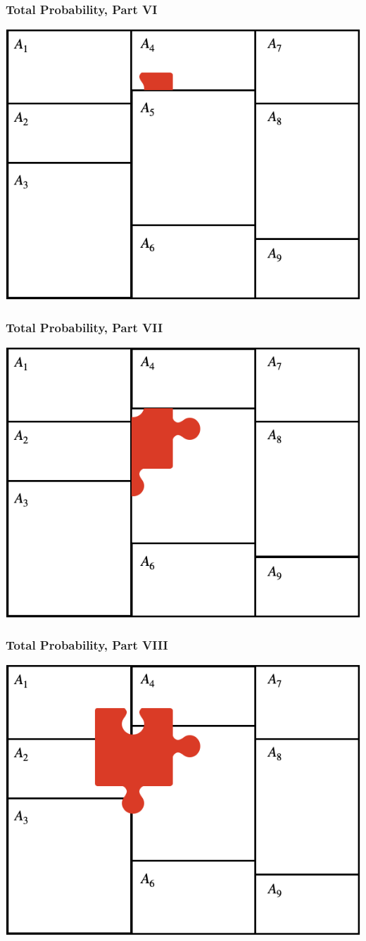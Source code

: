 \documentclass[12pt, block=fill]{beamer}
\begin{document}
\begin{frame}
  \frametitle{Total Probability, Part VI}
  \begin{center}
    \includegraphics[width=0.75\linewidth]{./figures/total_probability_4}
  \end{center} 
\end{frame}

\begin{frame}
  \frametitle{Total Probability, Part VII}
  \begin{center}
    \includegraphics[width=0.75\linewidth]{./figures/total_probability_5}
  \end{center} 
\end{frame}

\begin{frame}
  \frametitle{Total Probability, Part VIII}
  \begin{center}
    \includegraphics[width=0.75\linewidth]{./figures/total_probability_6}
  \end{center} 
\end{frame}
\end{document}
